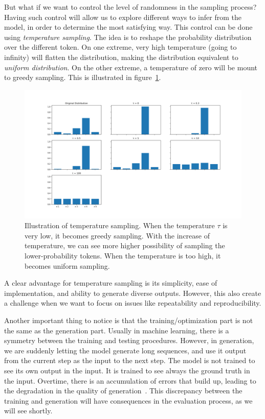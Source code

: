 \par But what if we want to control the level of randomness in the sampling process? Having such control will allow us to explore different ways to infer from the model, in order to determine the most satisfying way. This control can be done using \textit{temperature sampling}. The idea is to reshape the probability distribution over the different token. On one extreme, very high temperature (going to infinity) will flatten the distribution, making the distribution equivalent to \textit{uniform distribution}. On the other extreme, a temperature of zero will be mount to greedy sampling. This is illustrated in figure~\ref{fig:temperature_sampling}.

\begin{figure}
    \centering
    \includegraphics[scale=0.5]{images/gbem/temperature_sampling.png}
    \caption{Illustration of temperature sampling. When the temperature $\tau$ is very low, it becomes greedy sampling. With the increase of temperature, we can see more higher possibility of sampling the lower-probability tokens. When the temperature is too high, it becomes uniform sampling.}
    \label{fig:temperature_sampling}
\end{figure}

\par A clear advantage for temperature sampling is its simplicity, ease of implementation, and ability to generate diverse outputs. However, this also create a challenge when we want to focus on issues like repeatability and reproducibility.

\par Another important thing to notice is that the training/optimization part is not the same as the generation part. Usually in machine learning, there is a symmetry between the training and testing procedures. However, in generation, we are suddenly letting the model generate long sequences, and use it output from the current step as the input to the next step. The model is not trained to see its own output in the input. It is trained to see always the ground truth in the input. Overtime, there is an accumulation of errors that build up, leading to the degradation in the quality of generation~\citep{DBLP:journals/corr/RanzatoCAZ15}. This discrepancy between the training and generation will have consequences in the evaluation process, as we will see shortly.


